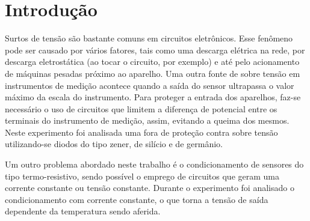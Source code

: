 \newpage
\section{Introdução}

Surtos de tensão são bastante comuns em circuitos eletrônicos. Esse fenômeno pode ser causado por vários fatores, tais como uma descarga elétrica na rede, por descarga eletrostática (ao tocar o circuito, por exemplo) e até pelo acionamento de máquinas pesadas próximo ao aparelho. Uma outra fonte de sobre tensão em instrumentos de medição acontece quando a saída do sensor ultrapassa o valor máximo da escala do instrumento.
Para proteger a entrada dos aparelhos, faz-se necessário o uso de circuitos que limitem a diferença de potencial entre os terminais do instrumento de medição, assim, evitando a queima dos mesmos.
Neste experimento foi analisada uma fora de proteção contra sobre tensão utilizando-se diodos do tipo zener, de silício e de germânio.

Um outro problema abordado neste trabalho é o condicionamento de sensores do tipo termo-resistivo, sendo possível o emprego de circuitos que geram uma corrente constante ou tensão constante. Durante o experimento foi analisado o condicionamento com corrente constante, o que torna a tensão de saída dependente da temperatura sendo aferida.